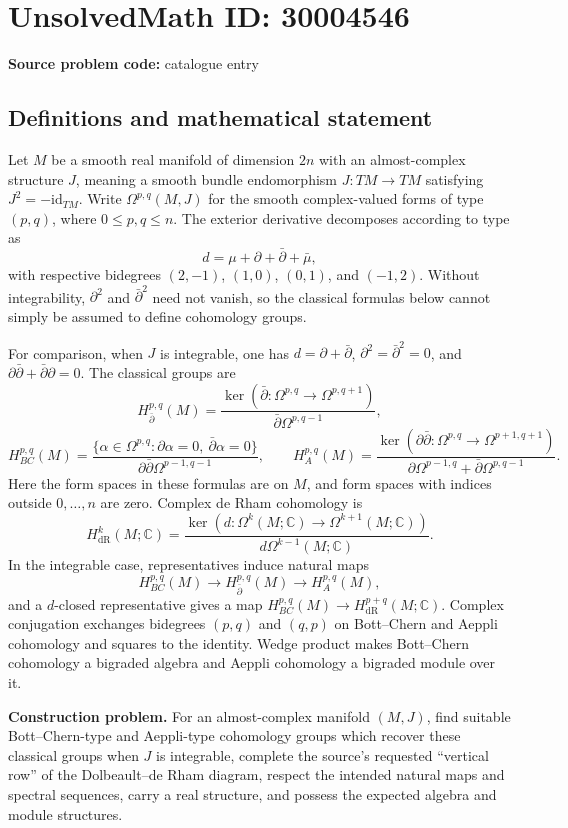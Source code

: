 \documentclass[11pt]{article}
\newcommand{\C}{\mathbb{C}}
\begin{document}
\section*{UnsolvedMath ID: 30004546}
\textbf{Source problem code:} catalogue entry
\subsection{Definitions and mathematical statement}
Let \(M\) be a smooth real manifold of dimension \(2n\) with an almost-complex structure \(J\), meaning a smooth bundle endomorphism \(J:TM\to TM\) satisfying \(J^2=-\mathrm{id}_{TM}\). Write \(\Omega^{p,q}(M,J)\) for the smooth complex-valued forms of type \((p,q)\), where \(0\leq p,q\leq n\). The exterior derivative decomposes according to type as
\[
d=\mu+\partial+\bar\partial+\bar\mu,
\]
with respective bidegrees \((2,-1)\), \((1,0)\), \((0,1)\), and \((-1,2)\). Without integrability, \(\partial^2\) and \(\bar\partial^2\) need not vanish, so the classical formulas below cannot simply be assumed to define cohomology groups.

For comparison, when \(J\) is integrable, one has \(d=\partial+\bar\partial\), \(\partial^2=\bar\partial^2=0\), and \(\partial\bar\partial+\bar\partial\partial=0\). The classical groups are
\[
H_{\bar\partial}^{p,q}(M)=\frac{\ker(\bar\partial:\Omega^{p,q}\to\Omega^{p,q+1})}{\bar\partial\Omega^{p,q-1}},
\]
\[
H_{BC}^{p,q}(M)=\frac{\{\alpha\in\Omega^{p,q}:\partial\alpha=0,\ \bar\partial\alpha=0\}}{\partial\bar\partial\Omega^{p-1,q-1}},
\qquad
H_A^{p,q}(M)=\frac{\ker(\partial\bar\partial:\Omega^{p,q}\to\Omega^{p+1,q+1})}{\partial\Omega^{p-1,q}+\bar\partial\Omega^{p,q-1}}.
\]
Here the form spaces in these formulas are on \(M\), and form spaces with indices outside \(0,\ldots,n\) are zero. Complex de Rham cohomology is
\[
H_{\mathrm{dR}}^k(M;\C)=\frac{\ker(d:\Omega^k(M;\C)\to\Omega^{k+1}(M;\C))}{d\Omega^{k-1}(M;\C)}.
\]
In the integrable case, representatives induce natural maps
\[
H_{BC}^{p,q}(M)\longrightarrow H_{\bar\partial}^{p,q}(M)\longrightarrow H_A^{p,q}(M),
\]
and a \(d\)-closed representative gives a map \(H_{BC}^{p,q}(M)\to H_{\mathrm{dR}}^{p+q}(M;\C)\). Complex conjugation exchanges bidegrees \((p,q)\) and \((q,p)\) on Bott--Chern and Aeppli cohomology and squares to the identity. Wedge product makes Bott--Chern cohomology a bigraded algebra and Aeppli cohomology a bigraded module over it.

\textbf{Construction problem.} For an almost-complex manifold \((M,J)\), find suitable Bott--Chern-type and Aeppli-type cohomology groups which recover these classical groups when \(J\) is integrable, complete the source's requested ``vertical row'' of the Dolbeault--de Rham diagram, respect the intended natural maps and spectral sequences, carry a real structure, and possess the expected algebra and module structures.
\end{document}
